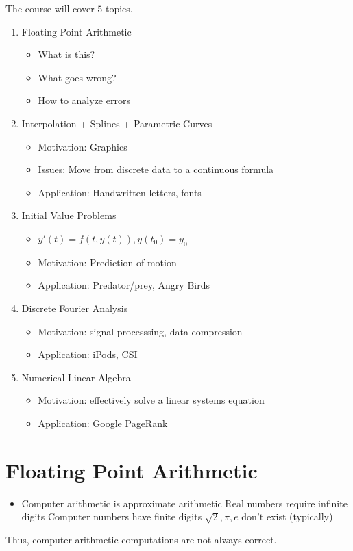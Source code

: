 \documentclass{article}
\begin{document}
\tpage
{}
The course will cover $5$ topics.

\begin{enumerate}
	\item Floating Point Arithmetic
		\begin{itemize}
			\item What is this?
			\item What goes wrong?
			\item How to analyze errors
		\end{itemize}
	\item Interpolation + Splines + Parametric Curves
		\begin{itemize}
			\item Motivation: Graphics
			\item Issues: Move from discrete data to a continuous formula
			\item Application: Handwritten letters, fonts
		\end{itemize}
	\item Initial Value Problems
		\begin{itemize}
			\item $y'(t) = f(t,y(t)), y(t_0) = y_0$
			\item Motivation: Prediction of motion
			\item Application: Predator/prey, Angry Birds
		\end{itemize}
	\item Discrete Fourier Analysis
		\begin{itemize}
			\item Motivation: signal processsing, data compression
			\item Application: iPods, CSI
		\end{itemize}
	\item Numerical Linear Algebra
		\begin{itemize}
			\item Motivation: effectively solve a linear systems equation
			\item Application: Google PageRank
		\end{itemize}
\end{enumerate}

\section{Floating Point Arithmetic}

\begin{itemize}
	\item Computer arithmetic is approximate arithmetic
		\subitem Real numbers require infinite digits
		\subitem Computer numbers have finite digits
		\subitem $\sqrt{2}, \pi, e$ don't exist (typically)
\end{itemize}
Thus, computer arithmetic computations are not always correct.
\end{document}
